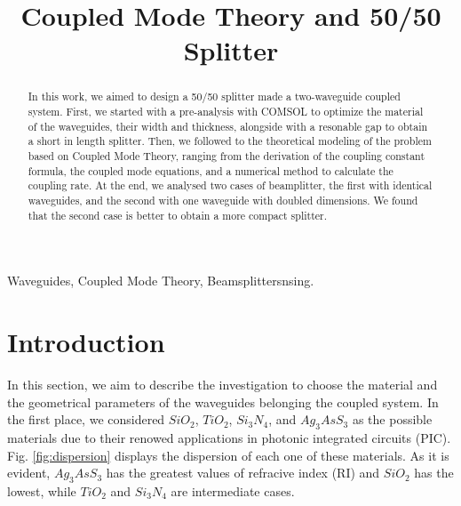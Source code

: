\documentclass[conference, a4paper]{IEEEtran}
\begin{document}
\title{Coupled Mode Theory and 50/50 Splitter}

\author{
\and
{}
}

\maketitle

\begin{abstract}
    In this work, we aimed to design a 50/50 splitter made a two-waveguide coupled system. First, we started with a pre-analysis with COMSOL to optimize the material of the waveguides, their width and thickness, alongside with a resonable gap to obtain a short in length splitter. Then, we followed to the theoretical modeling of the problem based on Coupled Mode Theory, ranging from the derivation of the coupling constant formula, the coupled mode equations, and a numerical method to calculate the coupling rate. At the end, we analysed two cases of beamplitter, the first with identical waveguides, and the second with one waveguide with doubled dimensions. We found that the second case is better to obtain a more compact splitter.
\end{abstract}

\begin{IEEEkeywords}
    Waveguides, Coupled Mode Theory, Beamsplittersnsing.
\end{IEEEkeywords}

\section{Introduction}
\label{sec:intro}

In this section, we aim to describe the investigation to choose the material and the geometrical parameters of the waveguides belonging the coupled system. In the first place, we considered $SiO_2$, $TiO_2$, $Si_3N_4$, and $Ag_3AsS_3$ as the possible materials due to their renowed applications in photonic integrated circuits (PIC). Fig. \ref{fig:dispersion} displays the dispersion of each one of these materials. As it is evident, $Ag_3AsS_3$ has the greatest values of refracive index (RI) and $SiO_2$ has the lowest, while $TiO_2$ and $Si_3N_4$ are intermediate cases. 
\end{document}
